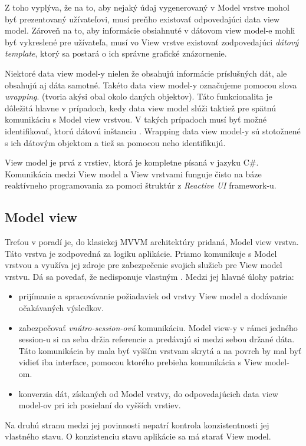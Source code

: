 \begin{itemize}
    Z toho vyplýva, že na to, aby nejaký údaj vygenerovaný v Model vrstve mohol byť prezentovaný užívateľovi, musí preňho existovať odpovedajúci data view model. Zároveň na to, aby informácie obsiahnuté v dátovom view model-e mohli byť vykreslené pre užívateľa, musí vo View vrstve existovať zodpovedajúci \textit{dátový template}, ktorý sa postará o ich správne grafické znázornenie.

    Niektoré data view model-y nielen že obsahujú informácie príslušných dát, ale obsahujú aj dáta samotné. Takéto data view model-y označujeme pomocou slova \textit{wrapping}. (tvoria akýsi obal okolo daných objektov). Táto funkcionalita je dôležitá hlavne v prípadoch, kedy data view model slúži taktiež pre spätnú komunikáciu s Model view vrstvou. V takých prípadoch musí byť možné identifikovať, ktorú dátovú inštanciu . Wrapping data view model-y sú stotožnené s ich dátovým objektom a tiež sa pomocou neho identifikujú.  
\end{itemize}


View model je prvá z vrstiev, ktorá je kompletne písaná v jazyku C\#. Komunikácia medzi View model a View vrstvami funguje čisto na báze reaktívneho programovania za pomoci štruktúr z \textit{Reactive UI} framework-u.  

\subsection{Model view}

Treťou v poradí je, do klasickej MVVM architektúry pridaná, Model view vrstva. Táto vrstva je zodpovedná za  logiku aplikácie. Priamo komunikuje s Model vrstvou a využíva jej zdroje pre zabezpečenie svojich služieb pre View model vrstvu. Dá sa povedať, že nedisponuje vlastným . Medzi jej hlavné úlohy patria:  
\begin{itemize}
    \item prijímanie a spracovávanie požiadaviek od vrstvy View model a dodávanie očakávaných výsledkov.  
    \item zabezpečovať \textit{vnútro-session-ovú} komunikáciu. Model view-y v rámci jedného session-u si na seba držia referencie a predávajú si medzi sebou držané dáta. Táto komunikácia by mala byť vyšším vrstvam skrytá a na povrch by mal byť vidieť iba interface, pomocou ktorého prebieha komunikácia s View model-om.
    \item konverzia dát, získaných od Model vrstvy, do odpovedajúcich data view model-ov pri ich posielaní do vyšších vrstiev.  
\end{itemize}
Na druhú stranu medzi jej povinnosti nepatrí kontrola konzistentnosti jej vlastného stavu. O konzistenciu stavu aplikácie sa má starať View model.

